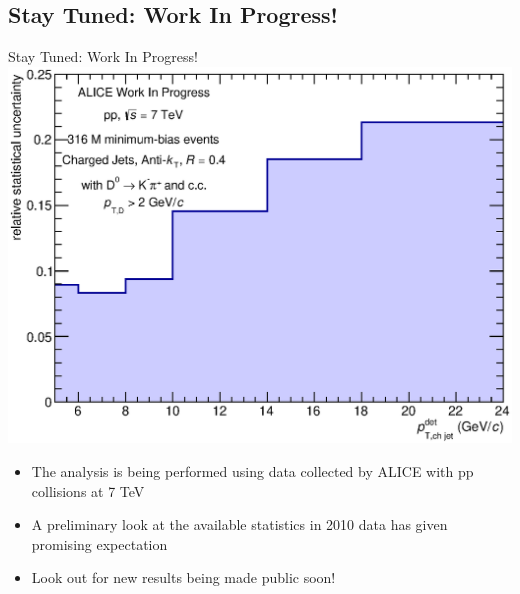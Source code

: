 \documentclass{beamer}
\begin{document}
\subsection*{Stay Tuned: Work In Progress!}
\begin{frame}{Stay Tuned: Work In Progress!}
\includegraphics[width=.5\paperwidth]{img/HQ16_WorkInProgress_StatisticalUncertainty}
\begin{itemize}
\item The analysis is being performed using data collected by ALICE with pp collisions at 7 TeV
\item A preliminary look at the available statistics in 2010 data has given promising expectation
\item Look out for new results being made public soon!
\end{itemize}
\end{frame}


\end{document}
